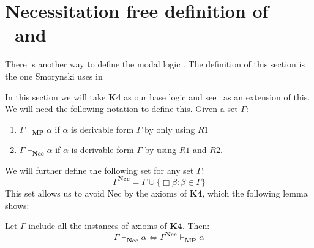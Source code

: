 \documentclass[../main.tex]{subfiles}
\begin{document}
\chapter{Necessitation free definition of \GL\ and \GLS}

There is another way to define the modal logic \GLS. The definition of this
section is the one Smorynski uses in \cite{Smor1985}

In this section we will take \textbf{K4} as our base logic and see \GL\  as an
extension of this.
We will need the following notation to
define this. Given a set $\Gamma$:
\begin{enumerate}
	\item $\Gamma\vdash_{\textbf{MP}}\alpha$ if $\alpha$ is derivable form $\Gamma$ by
		only using $R1$
	\item $\Gamma\vdash_{\textbf{Nec}}\alpha$ if $\alpha$ is derivable form $\Gamma$ by
		using $R1$ and $R2$.
\end{enumerate}
We will further define the following set for any set $\Gamma$:
\[
	\Gamma^{\textbf{Nec}}=\Gamma\cup\{\Box\beta:\beta\in\Gamma\}
\]
This set allows us to avoid Nec by the axioms of \textbf{K4}, which the
following lemma shows:
\begin{lem}
	Let $\Gamma$ include all the instances  of axioms of \textbf{K4}. Then:
	\[
		\Gamma\vdash_{\textbf{Nec}}\alpha\Leftrightarrow\Gamma^{\textbf{Nec}}\vdash_{\textbf{MP}}\alpha
	\]
\end{lem}
\end{document}
